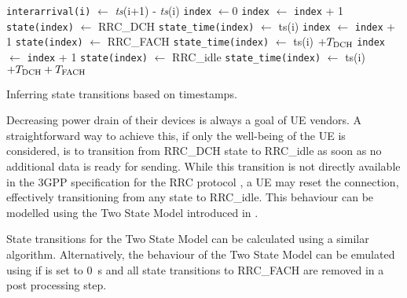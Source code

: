 \begin{algorithm}
  \begin{algorithmic}
    \State \texttt{interarrival(i)} $\leftarrow$ \emph{ts}(i+1) - \emph{ts}(i)
    \State \texttt{index} $\leftarrow 0$
        \State \texttt{index} $\leftarrow$ \texttt{index} + 1
        \State \texttt{state(index)} $\leftarrow$ \gls{RRC_DCH}
        \State \texttt{state\_time(index)} $\leftarrow$ ts(i)
      \EndIf
        \State \texttt{index} $\leftarrow$ \texttt{index} + 1
        \State \texttt{state(index)} $\leftarrow$ \gls{RRC_FACH}
        \State \texttt{state\_time(index)} $\leftarrow$ ts(i) $+ T_{\text{DCH}}$
      \EndIf
        \State \texttt{index} $\leftarrow$ \texttt{index} + 1
        \State \texttt{state(index)} $\leftarrow$ \gls{RRC_idle}
        \State \texttt{state\_time(index)} $\leftarrow$ ts(i) $+ T_{\text{DCH}} + T_{\text{FACH}}$
      \EndIf
    \EndFor
  \end{algorithmic}
  \caption{Inferring  state transitions based on  timestamps.}
  \label{alg:network:network_traces:performance_evaluation:inferring_network_state:inference_algorithm}
\end{algorithm}

Decreasing power drain of their devices is always a goal of \gls{UE} vendors.
A straightforward way to achieve this, if only the well-being of the \gls{UE} is considered, is to transition from \gls{RRC_DCH} state to \gls{RRC_idle} as soon as no additional data is ready for sending.
While this transition is not directly available in the 3GPP specification for the \gls{RRC} protocol \cite{3GPP_RRC_Spec}, a \gls{UE} may reset the connection, effectively transitioning from any state to \gls{RRC_idle}.
This behaviour can be modelled using the Two State Model introduced in .

State transitions for the Two State Model can be calculated using a similar algorithm.
Alternatively, the behaviour of the Two State Model can be emulated using  if \TFACH is set to \SI{0}{\second} and all state transitions to \gls{RRC_FACH} are removed in a post processing step.

